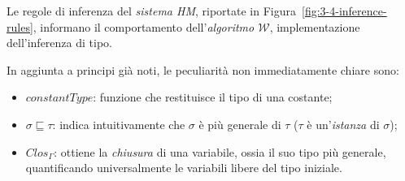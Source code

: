 \newpage

\noindent Le regole di inferenza \cite{Clement-1986-MiniML}
del \textit{sistema HM}, riportate in Figura~\ref{fig:3-4-inference-rules},
informano il comportamento dell'\textit{algoritmo $\mathcal{W}$}, implementazione dell'inferenza di tipo.

\noindent In aggiunta a principi già noti, le peculiarità non immediatamente chiare sono:
\begin{itemize}
    \item $constantType$: funzione che restituisce il tipo di una costante;
    \item $\sigma \sqsubseteq \tau$: indica intuitivamente che $\sigma$ è più generale di $\tau$
          ($\tau$ è un'\textit{istanza} di $\sigma$);
    \item $Clos_\Gamma$: ottiene la \textit{chiusura} di una variabile, ossia il suo tipo più generale,
          quantificando universalmente le variabili libere del tipo iniziale.
\end{itemize}

